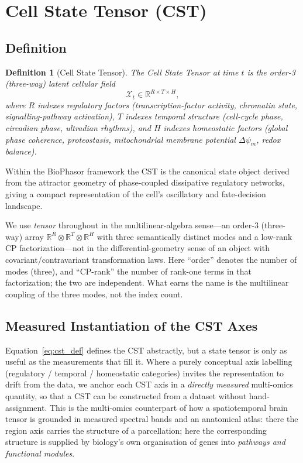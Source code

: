 \documentclass[preprint,12pt,amsmath,amssymb,superscriptaddress,floatfix]{revtex4-2}
\newcommand{\reals}{\mathbb{R}}
\newtheorem{definition}{Definition}[section]
\begin{document}
\section{Cell State Tensor (CST)}
\label{sec:cst}

\subsection{Definition}

\begin{definition}[Cell State Tensor]
The Cell State Tensor at time $t$ is the order-3 (three-way) latent cellular field
\begin{equation}
    \mathcal{X}_t \in \reals^{R \times T \times H},
    \label{eq:cst_def}
\end{equation}
where $R$ indexes regulatory factors (transcription-factor activity,
chromatin state, signalling-pathway activation), $T$ indexes temporal
structure (cell-cycle phase, circadian phase, ultradian rhythms), and $H$
indexes homeostatic factors (global phase coherence, proteostasis,
mitochondrial membrane potential $\Delta\psi_m$, redox balance).
\end{definition}

Within the BioPhasor framework the CST is the canonical state object derived
from the attractor geometry of phase-coupled dissipative regulatory
networks, giving a compact representation of the cell's oscillatory and
fate-decision landscape.

We use \emph{tensor} throughout in the multilinear-algebra sense---an order-3
(three-way) array $\reals^{R}\otimes\reals^{T}\otimes\reals^{H}$ with three
semantically distinct modes and a low-rank CP factorization---not in the
differential-geometry sense of an object with covariant/contravariant
transformation laws. Here ``order'' denotes the number of modes (three), and
``CP-rank'' the number of rank-one terms in that factorization; the two are
independent. What earns the name is the multilinear coupling of the three modes,
not the index count.

\subsection{Measured Instantiation of the CST Axes}
\label{subsec:cst_measured}

Equation~\eqref{eq:cst_def} defines the CST abstractly, but a state tensor is
only as useful as the measurements that fill it. Where a purely conceptual
axis labelling (regulatory / temporal / homeostatic categories) invites the
representation to drift from the data, we anchor each CST axis in a
\emph{directly measured} multi-omics quantity, so that a CST can be
constructed from a dataset without hand-assignment. This is the multi-omics
counterpart of how a spatiotemporal brain tensor is grounded in measured
spectral bands and an anatomical atlas: there the region axis carries the
structure of a parcellation; here the corresponding structure is supplied by
biology's own organisation of genes into \emph{pathways and functional
modules}.
\end{document}
